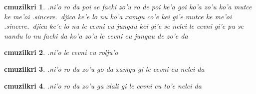 \documentclass{report}
\newtheorem{cmuzilkri}{cmuzilkri}
\begin{document}
\begin{cmuzilkri}
	.ni'o ro da poi se facki zo'u ro de poi ke'a goi ko'a zo'u ko'a mutce ke me'oi .sincere.\ djica ke'e lo nu ko'a xamgu co'e kei gi'e mutce ke me'oi .sincere.\ djica ke'e lo nu le cevni cu jungau kei gi'e se nelci le cevni gi'e pu se nandu lo nu facki da ko'a zo'u le cevni cu jungau de zo'e da
\end{cmuzilkri}
\begin{cmuzilkri}
	.ni'o le cevni cu rolju'o
\end{cmuzilkri}
\begin{cmuzilkri}
	.ni'o ro da zo'u go da xamgu gi le cevni cu nelci da
\end{cmuzilkri}
\begin{cmuzilkri}
	.ni'o ro da zo'u ga xlali gi le cevni cu to'e nelci da
\end{cmuzilkri}
\end{document}
